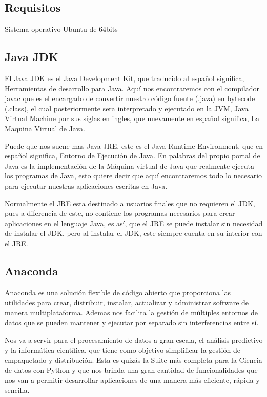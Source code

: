 \documentclass[a4paper,10pt]{article}
\begin{document}
\subsection{Requisitos}

Sistema operativo Ubuntu de 64bits

\clearpage

\subsection{Java JDK}

El Java JDK es el Java Development Kit, que traducido al español significa, Herramientas de desarrollo para Java. Aquí nos encontraremos con el compilador javac que es el encargado de convertir nuestro código fuente (.java) en bytecode (.class), el cual posteriormente sera interpretado y ejecutado en la JVM, Java Virtual Machine por sus siglas en ingles, que nuevamente en español significa, La Maquina Virtual de Java. 

Puede que nos suene mas Java JRE, este es el Java Runtime Environment, que en español significa, Entorno de Ejecución de Java. En palabras del propio portal de Java es la implementación de la Máquina virtual de Java que realmente ejecuta los programas de Java, esto quiere decir que aquí encontraremos todo lo necesario para ejecutar nuestras aplicaciones escritas en Java. 

Normalmente el JRE esta destinado a usuarios finales que no requieren el JDK, pues a diferencia de este, no contiene los programas necesarios para crear aplicaciones en el lenguaje Java, es así, que el JRE se puede instalar sin necesidad de instalar el JDK, pero al instalar el JDK, este siempre cuenta en su interior con el JRE.

\subsection{Anaconda}

Anaconda es una solución flexible de código abierto que proporciona las utilidades para crear, distribuir, instalar, actualizar y administrar software de manera multiplataforma. Ademas nos facilita la gestión de múltiples entornos de datos que se pueden mantener y ejecutar por separado sin interferencias entre sí.
 
Nos va a servir para el procesamiento de datos a gran escala, el análisis predictivo y la informática científica, que tiene como objetivo simplificar la gestión de empaquetado y distribución. Esta es quizás la Suite más completa para la Ciencia de datos con Python y que nos brinda una gran cantidad de funcionalidades que nos van a permitir desarrollar aplicaciones de una manera más eficiente, rápida y sencilla. 
\end{document}
